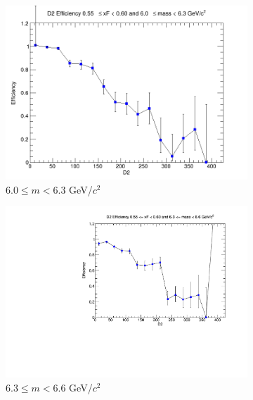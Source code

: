 \documentclass[11pt]{article}
\begin{document}
\begin{figure}[p]
\begin{subfigure}[b]{0.32\textwidth}
        \includegraphics[width=\textwidth]{./kTrackerEfficiencyPlots/D2_Efficiency_xF11_mass6.png}
        \caption{$6.0 \leq m < 6.3$ GeV/$c^2$}
    \end{subfigure}\hfill
    \begin{subfigure}[b]{0.32\textwidth}
        \centering
        \includegraphics[width=\textwidth]{./kTrackerEfficiencyPlots/D2_Efficiency_xF11_mass7.pdf}
        \caption{$6.3 \leq m < 6.6$ GeV/$c^2$}
    \end{subfigure}\hfill
    \begin{subfigure}[b]{0.32\textwidth}
        \centering

\end{subfigure}
\end{figure}
\end{document}
